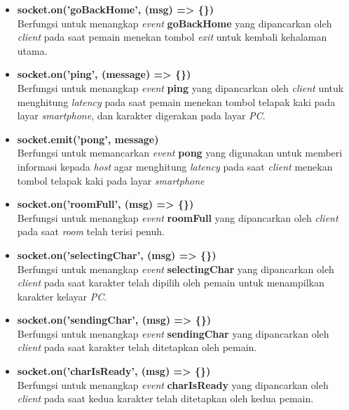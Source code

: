 \begin{enumerate}
\begin{enumerate}
\begin{itemize}
			\item \textbf{socket.on('goBackHome', (msg) => \{\})} \\
			Berfungsi untuk menangkap \textit{event} \textbf{goBackHome} yang dipancarkan oleh \textit{client} pada saat pemain menekan tombol \textit{exit} untuk kembali kehalaman utama.
			
			\item \textbf{socket.on('ping', (message) => \{\})} \\
			Berfungsi untuk menangkap \textit{event} \textbf{ping} yang dipancarkan oleh \textit{client} untuk menghitung \textit{latency} pada saat pemain menekan tombol telapak kaki pada layar \textit{smartphone}, dan karakter digerakan pada layar \textit{PC}.
			
			\item \textbf{socket.emit('pong', message)} \\ Berfungsi untuk memancarkan \textit{event} \textbf{pong} yang digunakan untuk memberi informasi kepada \textit{host} agar menghitung \textit{latency} pada saat \textit{client} menekan tombol telapak kaki pada layar \textit{smartphone}
			
			\item \textbf{socket.on('roomFull', (msg) => \{\})} \\
			Berfungsi untuk menangkap \textit{event} \textbf{roomFull} yang dipancarkan oleh \textit{client} pada saat \textit{room} telah terisi penuh.
			
			\item \textbf{socket.on('selectingChar', (msg) => \{\})} \\
			Berfungsi untuk menangkap \textit{event} \textbf{selectingChar} yang dipancarkan oleh \textit{client} pada saat karakter telah dipilih oleh pemain untuk menampilkan karakter kelayar \textit{PC}.
			
			\item \textbf{socket.on('sendingChar', (msg) => \{\})} \\
			Berfungsi untuk menangkap \textit{event} \textbf{sendingChar} yang dipancarkan oleh \textit{client} pada saat karakter telah ditetapkan oleh pemain.
			
			\item \textbf{socket.on('charIsReady', (msg) => \{\})} \\
			Berfungsi untuk menangkap \textit{event} \textbf{charIsReady} yang dipancarkan oleh \textit{client} pada saat kedua karakter telah ditetapkan oleh kedua pemain.
			

\end{itemize}
\end{enumerate}
\end{enumerate}
